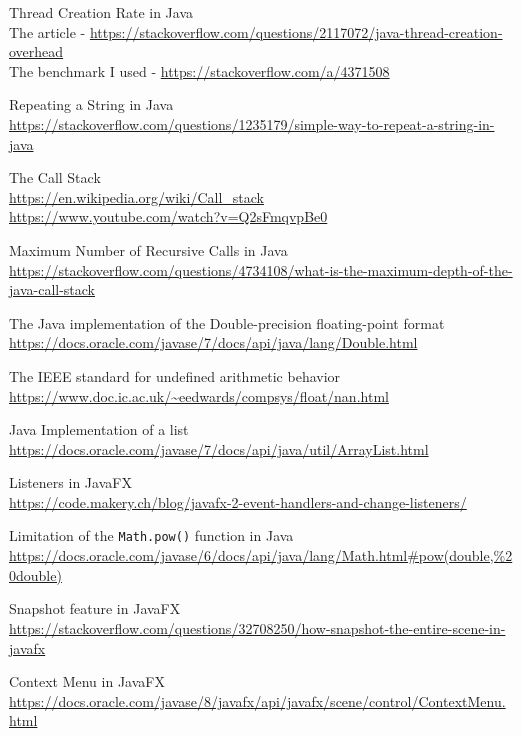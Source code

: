 \documentclass[../../main.tex]{subfiles}
\begin{document}
\begin{thebibliography}{9}
Thread Creation Rate in Java\\
The article - \url{https://stackoverflow.com/questions/2117072/java-thread-creation-overhead}\\
The benchmark I used - \url{https://stackoverflow.com/a/4371508}

Repeating a String in Java\\
\url{https://stackoverflow.com/questions/1235179/simple-way-to-repeat-a-string-in-java}

The Call Stack\\
\url{https://en.wikipedia.org/wiki/Call_stack}\\
\url{https://www.youtube.com/watch?v=Q2sFmqvpBe0}

Maximum Number of Recursive Calls in Java\\
\url{https://stackoverflow.com/questions/4734108/what-is-the-maximum-depth-of-the-java-call-stack}

The Java implementation of the Double-precision floating-point format\\
\url{https://docs.oracle.com/javase/7/docs/api/java/lang/Double.html}

The IEEE standard for undefined arithmetic behavior\\
\url{https://www.doc.ic.ac.uk/~eedwards/compsys/float/nan.html}

Java Implementation of a list\\
\url{https://docs.oracle.com/javase/7/docs/api/java/util/ArrayList.html}

Listeners in JavaFX\\
\url{https://code.makery.ch/blog/javafx-2-event-handlers-and-change-listeners/}

Limitation of the \texttt{Math.pow()} function in Java\\
\url{https://docs.oracle.com/javase/6/docs/api/java/lang/Math.html#pow(double,%20double)}

Snapshot feature in JavaFX\\
\url{https://stackoverflow.com/questions/32708250/how-snapshot-the-entire-scene-in-javafx}

Context Menu in JavaFX\\
\url{https://docs.oracle.com/javase/8/javafx/api/javafx/scene/control/ContextMenu.html}


\end{thebibliography}
\end{document}
